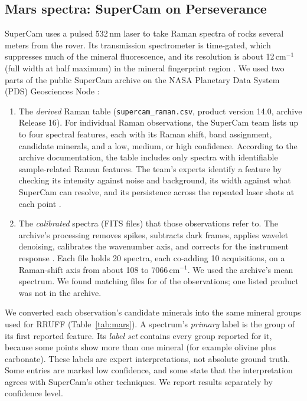 \subsection{Mars spectra: SuperCam on Perseverance}
SuperCam uses a pulsed 532\,nm laser to take Raman spectra of rocks several meters from the rover. Its transmission spectrometer is time-gated, which suppresses much of the mineral fluorescence, and its resolution is about 12\,cm$^{-1}$ (full width at half maximum) in the mineral fingerprint region \citep{wiens2021supercam,maurice2021supercam}. We used two parts of the public SuperCam archive on the NASA Planetary Data System (PDS) Geosciences Node \citep{wiens2021supercambundle}:
\begin{enumerate}
\item The \emph{derived} Raman table (\texttt{supercam\_raman.csv}, product version 14.0, archive Release 16). For \nMarsRows{} individual Raman observations, the SuperCam team lists up to four spectral features, each with its Raman shift, band assignment, candidate minerals, and a low, medium, or high confidence. According to the archive documentation, the table includes only spectra with identifiable sample-related Raman features. The team's experts identify a feature by checking its intensity against noise and background, its width against what SuperCam can resolve, and its persistence across the repeated laser shots at each point \citep{jpl2026supercamsis}.
\item The \emph{calibrated} spectra (FITS files) that those observations refer to. The archive's processing removes spikes, subtracts dark frames, applies wavelet denoising, calibrates the wavenumber axis, and corrects for the instrument response \citep{jpl2026supercamsis}. Each file holds 20 spectra, each co-adding 10 acquisitions, on a Raman-shift axis from about 108 to 7066\,cm$^{-1}$. We used the archive's mean spectrum. We found matching files for \nMarsMatched{} of the \nMarsRows{} observations; one listed product was not in the archive.
\end{enumerate}
We converted each observation's candidate minerals into the same mineral groups used for RRUFF (Table~\ref{tab:mars}). A spectrum's \emph{primary} label is the group of its first reported feature. Its \emph{label set} contains every group reported for it, because some points show more than one mineral (for example olivine plus carbonate). These labels are expert interpretations, not absolute ground truth. Some entries are marked low confidence, and some state that the interpretation agrees with SuperCam's other techniques. We report results separately by confidence level.

